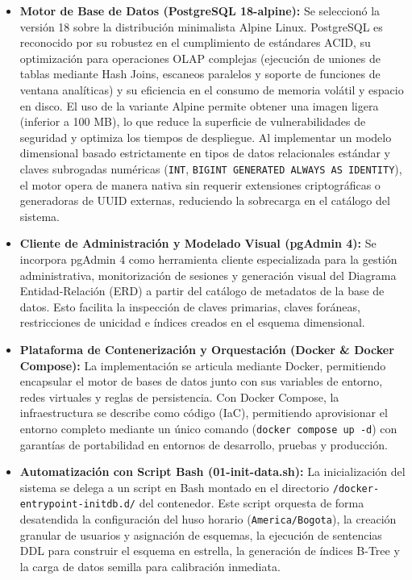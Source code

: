 \begin{itemize}
	\item \textbf{Motor de Base de Datos (PostgreSQL 18-alpine):} Se seleccionó la versión 18 sobre la distribución minimalista Alpine Linux. PostgreSQL es reconocido por su robustez en el cumplimiento de estándares ACID, su optimización para operaciones OLAP complejas (ejecución de uniones de tablas mediante Hash Joins, escaneos paralelos y soporte de funciones de ventana analíticas) y su eficiencia en el consumo de memoria volátil y espacio en disco. El uso de la variante Alpine permite obtener una imagen ligera (inferior a 100 MB), lo que reduce la superficie de vulnerabilidades de seguridad y optimiza los tiempos de despliegue. Al implementar un modelo dimensional basado estrictamente en tipos de datos relacionales estándar y claves subrogadas numéricas (\texttt{INT}, \texttt{BIGINT GENERATED ALWAYS AS IDENTITY}), el motor opera de manera nativa sin requerir extensiones criptográficas o generadoras de UUID externas, reduciendo la sobrecarga en el catálogo del sistema.
	\item \textbf{Cliente de Administración y Modelado Visual (pgAdmin 4):} Se incorpora pgAdmin 4 como herramienta cliente especializada para la gestión administrativa, monitorización de sesiones y generación visual del Diagrama Entidad-Relación (ERD) a partir del catálogo de metadatos de la base de datos. Esto facilita la inspección de claves primarias, claves foráneas, restricciones de unicidad e índices creados en el esquema dimensional.
	\item \textbf{Plataforma de Contenerización y Orquestación (Docker \& Docker Compose):} La implementación se articula mediante Docker, permitiendo encapsular el motor de bases de datos junto con sus variables de entorno, redes virtuales y reglas de persistencia. Con Docker Compose, la infraestructura se describe como código (IaC), permitiendo aprovisionar el entorno completo mediante un único comando (\texttt{docker compose up -d}) con garantías de portabilidad en entornos de desarrollo, pruebas y producción.
	\item \textbf{Automatización con Script Bash (01-init-data.sh):} La inicialización del sistema se delega a un script en Bash montado en el directorio \texttt{/docker-entrypoint-initdb.d/} del contenedor. Este script orquesta de forma desatendida la configuración del huso horario (\texttt{America/Bogota}), la creación granular de usuarios y asignación de esquemas, la ejecución de sentencias DDL para construir el esquema en estrella, la generación de índices B-Tree y la carga de datos semilla para calibración inmediata.
\end{itemize}

